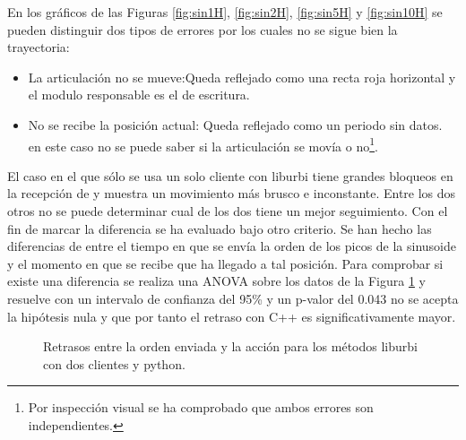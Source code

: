 \documentclass[12pt,a4paper,final,twoside]{article}
\begin{document}
En los gráficos de las Figuras \ref{fig:sin1H}, \ref{fig:sin2H}, \ref{fig:sin5H} y \ref{fig:sin10H} se pueden distinguir  dos tipos de errores por los cuales no se sigue bien la trayectoria:

\begin{itemize}
\item La articulación no se mueve:Queda reflejado como una recta roja horizontal y el modulo responsable es el de escritura.
\item No se recibe la posición actual: Queda reflejado como un periodo sin datos. en este caso no se puede saber si la articulación se movía o no\footnote{Por inspección visual se ha comprobado que ambos errores son independientes.}.
\end{itemize}
El caso en el que sólo se usa un solo cliente con liburbi tiene grandes bloqueos en la recepción de y muestra un movimiento más brusco e inconstante.
Entre los dos otros no se puede determinar cual de los dos tiene un mejor seguimiento. Con el fin de marcar la diferencia se ha evaluado bajo otro criterio.
Se han hecho las diferencias de entre el tiempo en que se envía la orden de los picos de la sinusoide y el momento en que se recibe que ha llegado a tal posición. Para comprobar si existe una diferencia se realiza una ANOVA sobre los datos de la Figura \ref{fig:retras} y resuelve con un intervalo de confianza del 95\% y un p-valor del 0.043 no se acepta la hipótesis nula y que por tanto el retraso con C++ es significativamente mayor. 
 
\begin{figure}[H]
	\centering
{}
	 \caption{Retrasos entre la orden enviada y la acción para los métodos liburbi con dos clientes y python.}
  \label{fig:retras}
\end{figure}
\end{document}
